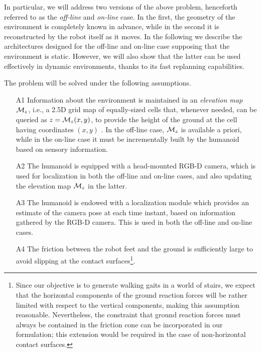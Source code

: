 In particular, we will address two versions of the above problem, henceforth referred to as the \textit{off-line} and \textit{on-line} case. In the first, the geometry of the environment is completely known in advance, while in the second it is reconstructed by the robot itself as it moves. 
In the following we describe the architectures designed for the off-line and on-line case supposing that the environment is static.
However, we will also show that the latter can be used effectively in dynamic environments, thanks to its fast replanning capabilities. 

The problem will be solved under the following assumptions.

\begin{itemize}

\item[A1] Information about the environment is maintained in an {\em elevation map} ${\cal M}_{z}$, i.e., a 2.5D grid map of equally-sized cells that, whenever needed, can be queried as $z = {\cal M}_{z}(x,y)$, to provide the height of the ground at the cell having coordinates $(x,y)$ \cite{BuHeBe:16}.
In the off-line case, ${\cal M}_{z}$ is available a priori, while in the on-line case it must be incrementally built by the humanoid based on sensory information. 
    
\item[A2] The humanoid is equipped with a head-mounted RGB-D camera, which is used for localization in both the off-line and on-line cases, and also updating the elevation map ${\cal M}_{z}$ in the latter.
    
\item[A3] The humanoid is endowed with a localization module which provides an estimate of the camera pose at each time instant, based on information gathered by the RGB-D camera. This is used in both the off-line and on-line cases.

\item[A4] The friction between the robot feet and the ground is sufficiently large to avoid slipping at the contact surfaces\footnote{Since our objective is to generate walking gaits in a world of stairs, we expect that the horizontal components of the ground reaction forces will be rather limited with respect to the vertical components, making this assumption reasonable. Nevertheless, the constraint that ground reaction forces must always be contained in the friction cone can be incorporated in our formulation; this extension would be required in the case of non-horizontal contact surfaces.}.

\end{itemize}

